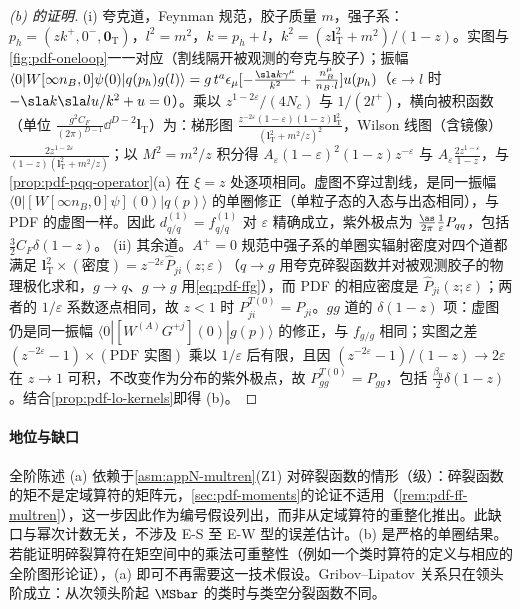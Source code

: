 \begin{proof}[(b) 的证明]
(i) 夸克道，Feynman 规范，胶子质量 $m$，强子系：$p_h=(zk^+,0^-,\bm 0_{\mathrm T})$，$l^2=m^2$，$k=p_h+l$，$k^2=(z\bm l_{\mathrm T}^2+m^2)/(1-z)$。实图与\cref{fig:pdf-oneloop}一一对应（割线隔开被观测的夸克与胶子）；振幅 $\langle0|W[\infty n_B,0]\psi(0)|q(p_h)g(l)\rangle=g\,t^a\epsilon_\mu[-\frac{\sla k\gamma^\mu}{k^2}+\frac{n_B^\mu}{n_B\cdot l}]u(p_h)$（$\epsilon\to l$ 时 $-\sla k\sla lu/k^2+u=0$）。乘以 $z^{1-2\varepsilon}/(4N_c)$ 与 $1/(2l^+)$，横向被积函数（单位 $\frac{g^2C_F}{(2\pi)^{D-1}}\dd^{D-2}\bm l_{\mathrm T}$）为：梯形图 $\frac{z^{-2\varepsilon}(1-\varepsilon)(1-z)\bm l_{\mathrm T}^2}{(\bm l_{\mathrm T}^2+m^2/z)^2}$，Wilson 线图（含镜像）$\frac{2z^{1-2\varepsilon}}{(1-z)(\bm l_{\mathrm T}^2+m^2/z)}$；以 $M^2=m^2/z$ 积分得 $A_\varepsilon(1-\varepsilon)^2(1-z)z^{-\varepsilon}$ 与 $A_\varepsilon\frac{2z^{1-\varepsilon}}{1-z}$，与\cref{prop:pdf-pqq-operator}(a) 在 $\xi=z$ 处逐项相同。虚图不穿过割线，是同一振幅 $\langle0|[W[\infty n_B,0]\psi](0)|q(p)\rangle$ 的单圈修正（单粒子态的入态与出态相同），与 PDF 的虚图一样。因此 $d^{(1)}_{q/q}=f^{(1)}_{q/q}$ 对 $\varepsilon$ 精确成立，紫外极点为 $\frac{\as}{2\pi}\frac1\varepsilon P_{qq}$，包括 $\frac32C_F\delta(1-z)$。
(ii) 其余道。$A^+=0$ 规范中强子系的单圈实辐射密度对四个道都满足 $\bm l_{\mathrm T}^2\times(\text{密度})=z^{-2\varepsilon}\hat P_{ji}(z;\varepsilon)$（$q\to g$ 用夸克碎裂函数并对被观测胶子的物理极化求和，$g\to q$、$g\to g$ 用\cref{eq:pdf-ffg}），而 PDF 的相应密度是 $\hat P_{ji}(z;\varepsilon)$；两者的 $1/\varepsilon$ 系数逐点相同，故 $z<1$ 时 $P^{T(0)}_{ji}=P_{ji}$。$gg$ 道的 $\delta(1-z)$ 项：虚图仍是同一振幅 $\langle0|[W^{(A)}G^{+j}](0)|g(p)\rangle$ 的修正，与 $f_{g/g}$ 相同；实图之差 $(z^{-2\varepsilon}-1)\times(\text{PDF 实图})$ 乘以 $1/\varepsilon$ 后有限，且因 $(z^{-2\varepsilon}-1)/(1-z)\to2\varepsilon$ 在 $z\to1$ 可积，不改变作为分布的紫外极点，故 $P^{T(0)}_{gg}=P_{gg}$，包括 $\frac{\beta_0}2\delta(1-z)$。结合\cref{prop:pdf-lo-kernels}即得 (b)。
\end{proof}

\paragraph{地位与缺口}
全阶陈述 (a) 依赖于\cref{asm:appN-multren}(Z1) 对碎裂函数的情形（\tagA 级）：碎裂函数的矩不是定域算符的矩阵元，\cref{sec:pdf-moments}的论证不适用（\cref{rem:pdf-ff-multren}），这一步因此作为编号假设列出，而非从定域算符的重整化推出。此缺口与幂次计数无关，不涉及 E-S 至 E-W 型的误差估计。(b) 是严格的单圈结果。若能证明碎裂算符在矩空间中的乘法可重整性（例如一个类时算符的定义与相应的全阶图形论证），(a) 即可不再需要这一技术假设。Gribov--Lipatov 关系只在领头阶成立：从次领头阶起 $\MSbar$ 的类时与类空分裂函数不同\cite{CurciFurmanskiPetronzio1980}。

